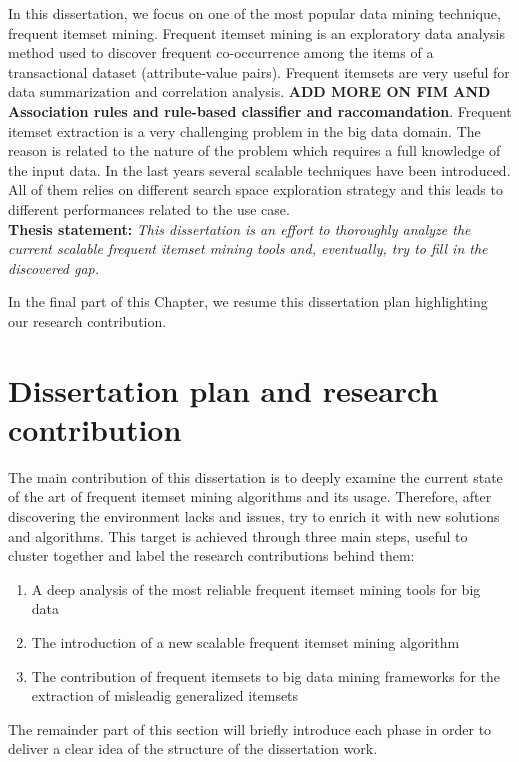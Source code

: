 In this dissertation, we focus on one of the most popular data mining technique, frequent itemset mining. Frequent itemset mining is an exploratory data analysis method used to discover frequent co-occurrence among the items of a transactional dataset (attribute-value pairs). Frequent itemsets are very useful for data summarization and correlation analysis. \textbf{ADD MORE ON FIM AND Association rules and rule-based classifier and raccomandation}.
Frequent itemset extraction is a very challenging problem in the big data domain. The reason is related to the nature of the problem which requires a full knowledge of the input data. In the last years several scalable techniques have been introduced. All of them relies on different search space exploration strategy and this leads to different performances related to the use case. 
\\

\textbf{Thesis statement: }\textit{This dissertation is an effort to thoroughly analyze the current scalable frequent itemset mining tools and, eventually, try to fill in the discovered gap.}

In the final part of this Chapter, we resume this dissertation plan highlighting our research contribution.

\section{Dissertation plan and research contribution}
The main contribution of this dissertation is to deeply examine the current state of the art of frequent itemset mining algorithms and its usage. Therefore, after discovering the environment lacks and issues, try to enrich it with new solutions and algorithms. 
This target is achieved through three main steps, useful to cluster together and label the research contributions behind them:
\begin{enumerate}
\item A deep analysis of the most reliable frequent itemset mining tools for big data
\item The introduction of a new scalable frequent itemset mining algorithm
\item The contribution of frequent itemsets to big data mining frameworks for the extraction of misleadig generalized itemsets
\end{enumerate}
The remainder part of this section will briefly introduce each phase in order to deliver a clear idea of the structure of the dissertation work.




